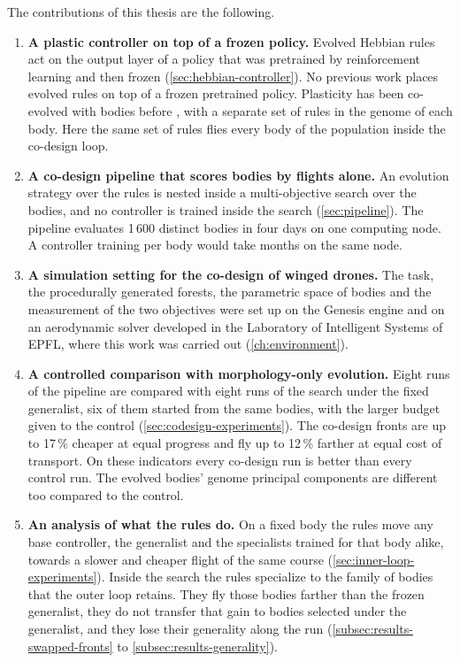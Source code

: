 The contributions of this thesis are the following.
\begin{enumerate}
\item \textbf{A plastic controller on top of a frozen policy.} Evolved Hebbian rules act on the output layer of a policy that was pretrained by reinforcement learning and then frozen (\autoref{sec:hebbian-controller}). No previous work places evolved rules on top of a frozen pretrained policy. Plasticity has been co-evolved with bodies before \cite{ferigo2025totipotent}, with a separate set of rules in the genome of each body. Here the same set of rules flies every body of the population inside the co-design loop.
\item \textbf{A co-design pipeline that scores bodies by flights alone.} An evolution strategy over the rules is nested inside a multi-objective search over the bodies, and no controller is trained inside the search (\autoref{sec:pipeline}). The pipeline evaluates 1\,600 distinct bodies in four days on one computing node. A controller training per body would take months on the same node.
\item \textbf{A simulation setting for the co-design of winged drones.} The task, the procedurally generated forests, the parametric space of bodies and the measurement of the two objectives were set up on the Genesis engine \cite{genesis2024} and on an aerodynamic solver developed in the Laboratory of Intelligent Systems of EPFL, where this work was carried out (\autoref{ch:environment}).
\item \textbf{A controlled comparison with morphology-only evolution.} Eight runs of the pipeline are compared with eight runs of the search under the fixed generalist, six of them started from the same bodies, with the larger budget given to the control (\autoref{sec:codesign-experiments}). The co-design fronts are up to 17\,\% cheaper at equal progress and fly up to 12\,\% farther at equal cost of transport. On these indicators every co-design run is better than every control run. The evolved bodies' genome principal components are different too compared to the control.
\item \textbf{An analysis of what the rules do.} On a fixed body the rules move any base controller, the generalist and the specialists trained for that body alike, towards a slower and cheaper flight of the same course (\autoref{sec:inner-loop-experiments}). Inside the search the rules specialize to the family of bodies that the outer loop retains. They fly those bodies farther than the frozen generalist, they do not transfer that gain to bodies selected under the generalist, and they lose their generality along the run (\autoref{subsec:results-swapped-fronts} to \autoref{subsec:results-generality}).
\end{enumerate}

